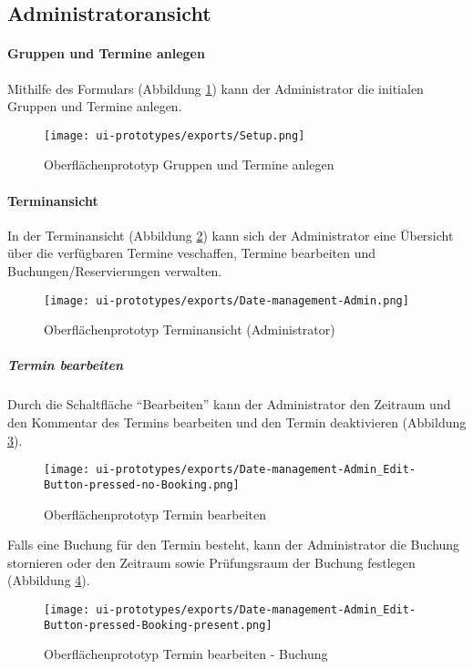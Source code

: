 \subsection{Administratoransicht}

\paragraph{Gruppen und Termine anlegen}
Mithilfe des Formulars (Abbildung \ref{fig:setup}) kann der Administrator die initialen Gruppen und Termine anlegen.
\begin{figure}
  \centering
  \texttt{[image: ui-prototypes/exports/Setup.png]}
  \caption{Oberflächenprototyp Gruppen und Termine anlegen}
  \label{fig:setup}
\end{figure}

\paragraph{Terminansicht}
In der Terminansicht (Abbildung \ref{fig:date-management-admin}) kann sich der Administrator eine Übersicht über die verfügbaren Termine veschaffen, Termine bearbeiten und Buchungen/Reservierungen verwalten.
\begin{figure}
  \centering
  \texttt{[image: ui-prototypes/exports/Date-management-Admin.png]}
  \caption{Oberflächenprototyp Terminansicht (Administrator)}
  \label{fig:date-management-admin}
\end{figure}

\subparagraph{Termin bearbeiten}
Durch die Schaltfläche ``Bearbeiten'' kann der Administrator den Zeitraum und den Kommentar des Termins bearbeiten und den Termin deaktivieren (Abbildung \ref{fig:edit-button-pressed-no-booking}).
\begin{figure}
  \centering
  \texttt{[image: ui-prototypes/exports/Date-management-Admin\_Edit-Button-pressed-no-Booking.png]}
  \caption{Oberflächenprototyp Termin bearbeiten}
  \label{fig:edit-button-pressed-no-booking}
\end{figure}

Falls eine Buchung für den Termin besteht, kann der Administrator die Buchung stornieren oder den Zeitraum sowie Prüfungsraum der Buchung festlegen (Abbildung \ref{fig:edit-button-pressed-booking}).
\begin{figure}
  \centering
  \texttt{[image: ui-prototypes/exports/Date-management-Admin\_Edit-Button-pressed-Booking-present.png]}
  \caption{Oberflächenprototyp Termin bearbeiten - Buchung}
  \label{fig:edit-button-pressed-booking}
\end{figure}

